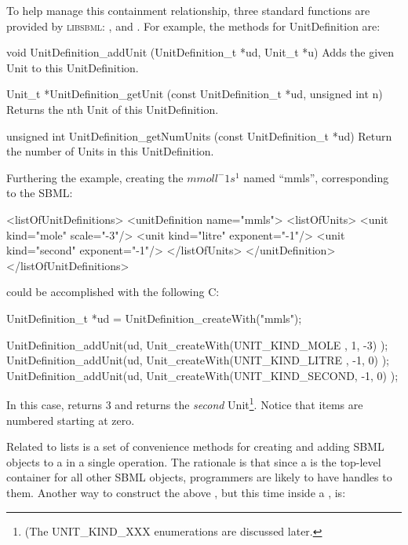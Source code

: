 \documentclass{cekmanual}
\newcommand{\libsbml}{\textsc{libsbml}}
\begin{document}
To help manage this containment relationship, three standard functions are
provided by \libsbml{}: ,  and
.  For example, the methods for UnitDefinition
are:


\begin{methoddef}{void UnitDefinition\_addUnit (UnitDefinition\_t *ud,
Unit\_t *u)}
  Adds the given Unit to this UnitDefinition.
\end{methoddef}

\begin{methoddef}{Unit\_t *UnitDefinition\_getUnit (const UnitDefinition\_t
*ud, unsigned int n)}
Returns the nth Unit of this UnitDefinition.
\end{methoddef}

\begin{methoddef}{unsigned int UnitDefinition\_getNumUnits (const
UnitDefinition\_t *ud)}
  Return the number of Units in this UnitDefinition.
\end{methoddef}


Furthering the example, creating the  $mmol l^-1
s^1$ named ``mmls'', corresponding to the SBML:

\begin{example}
<listOfUnitDefinitions>
  <unitDefinition name="mmls">
    <listOfUnits>
      <unit kind="mole"   scale="-3"/>
      <unit kind="litre"  exponent="-1"/>
      <unit kind="second" exponent="-1"/>
    </listOfUnits>
  </unitDefinition>
</listOfUnitDefinitions>
\end{example}


could be accomplished with the following C:

\begin{example}[c]
UnitDefinition_t *ud = UnitDefinition_createWith("mmls");

UnitDefinition_addUnit(ud, Unit_createWith(UNIT_KIND_MOLE  ,  1, -3) );
UnitDefinition_addUnit(ud, Unit_createWith(UNIT_KIND_LITRE , -1,  0) );
UnitDefinition_addUnit(ud, Unit_createWith(UNIT_KIND_SECOND, -1,  0) );
\end{example}


In this case, 
returns 3 and 
returns the \emph{second} Unit\footnote{(The UNIT\_KIND\_XXX
enumerations are discussed later.}.  Notice that items are numbered
starting at zero.

Related to lists is a set of convenience methods for creating and
adding SBML objects to a  in a single operation.  The
rationale is that since a  is the top-level container for
all other SBML objects, programmers are likely to have handles to
them.  Another way to construct the above , but
this time inside a , is:
\end{document}
